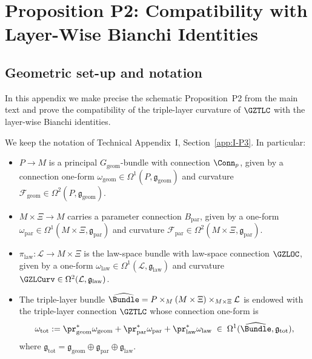 \documentclass[11pt]{book}
\theoremstyle{plain}
\theoremstyle{definition}
\begin{document}
\section{Proposition P2: Compatibility with Layer-Wise Bianchi Identities}
\label{app:II-P2}

\subsection*{Geometric set-up and notation}


In this appendix we make precise the schematic Proposition~P2 from the
main text and prove the compatibility of the triple-layer curvature of
\(\GZTLC\) with the layer-wise Bianchi identities.

We keep the notation of Technical Appendix~I, Section~\ref{app:I-P3}.
In particular:

\begin{itemize}
  \item \(P\to M\) is a principal \(G_{\mathrm{geom}}\)-bundle with
        connection \(\Conn_p\), given by a connection one-form
        \(\omega_{\mathrm{geom}}\in\Omega^1(P,\mathfrak{g}_{\mathrm{geom}})\)
        and curvature
        \(\mathcal{F}_{\mathrm{geom}}\in
         \Omega^2(P,\mathfrak{g}_{\mathrm{geom}})\).
  \item \(M\times\Xi\to M\) carries a parameter connection
        \(B_{\mathrm{par}}\), given by a one-form
        \(\omega_{\mathrm{par}}\in
         \Omega^1(M\times\Xi,\mathfrak{g}_{\mathrm{par}})\) and curvature
        \(\mathcal{F}_{\mathrm{par}}\in
         \Omega^2(M\times\Xi,\mathfrak{g}_{\mathrm{par}})\).
  \item \(\pi_{\mathrm{law}}:\mathcal{L}\to M\times\Xi\) is the
        law-space bundle with law-space connection \(\GZLOC\), given
        by a one-form
        \(\omega_{\mathrm{law}}\in
         \Omega^1(\mathcal{L},\mathfrak{g}_{\mathrm{law}})\) and curvature
        \(\GZLCurv\in\Omega^2(\mathcal{L},\mathfrak{g}_{\mathrm{law}})\).
  \item The triple-layer bundle
        \(\widehat{\Bundle}
          =P\times_M(M\times\Xi)\times_{M\times\Xi}\mathcal{L}\)
        is endowed with the triple-layer connection \(\GZTLC\) whose
        connection one-form is
        \[
          \omega_{\mathrm{tot}}
          :=
          \pr_{\mathrm{geom}}^*\omega_{\mathrm{geom}}
          +
          \pr_{\mathrm{par}}^*\omega_{\mathrm{par}}
          +
          \pr_{\mathrm{law}}^*\omega_{\mathrm{law}}
          \;\in\;
          \Omega^1(\widehat{\Bundle},\mathfrak{g}_{\mathrm{tot}}),
        \]
        where
        \(\mathfrak{g}_{\mathrm{tot}}
          =\mathfrak{g}_{\mathrm{geom}}
           \oplus\mathfrak{g}_{\mathrm{par}}
           \oplus\mathfrak{g}_{\mathrm{law}}\).
\end{itemize}
\end{document}
